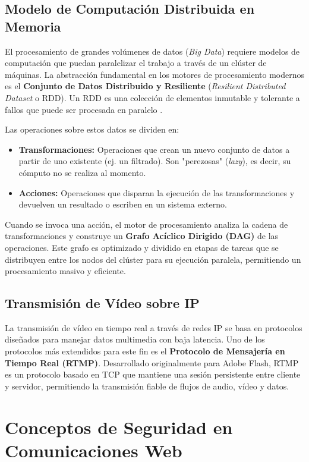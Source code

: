 \subsection{Modelo de Computación Distribuida en Memoria}
El procesamiento de grandes volúmenes de datos (\textit{Big Data}) requiere modelos de computación que puedan paralelizar el trabajo a través de un clúster de máquinas. La abstracción fundamental en los motores de procesamiento modernos es el \textbf{Conjunto de Datos Distribuido y Resiliente} (\textit{Resilient Distributed Dataset} o RDD). Un RDD es una colección de elementos inmutable y tolerante a fallos que puede ser procesada en paralelo \cite{zaharia2012resilient}.

Las operaciones sobre estos datos se dividen en:
\begin{itemize}
    \item \textbf{Transformaciones:} Operaciones que crean un nuevo conjunto de datos a partir de uno existente (ej. un filtrado). Son "perezosas" (\textit{lazy}), es decir, su cómputo no se realiza al momento.
    \item \textbf{Acciones:} Operaciones que disparan la ejecución de las transformaciones y devuelven un resultado o escriben en un sistema externo.
\end{itemize}
Cuando se invoca una acción, el motor de procesamiento analiza la cadena de transformaciones y construye un \textbf{Grafo Acíclico Dirigido (DAG)} de las operaciones. Este grafo es optimizado y dividido en etapas de tareas que se distribuyen entre los nodos del clúster para su ejecución paralela, permitiendo un procesamiento masivo y eficiente.

\subsection{Transmisión de Vídeo sobre IP}
La transmisión de vídeo en tiempo real a través de redes IP se basa en protocolos diseñados para manejar datos multimedia con baja latencia. Uno de los protocolos más extendidos para este fin es el \textbf{Protocolo de Mensajería en Tiempo Real (RTMP)}. Desarrollado originalmente para Adobe Flash, RTMP es un protocolo basado en TCP que mantiene una sesión persistente entre cliente y servidor, permitiendo la transmisión fiable de flujos de audio, vídeo y datos.

\section{Conceptos de Seguridad en Comunicaciones Web}
